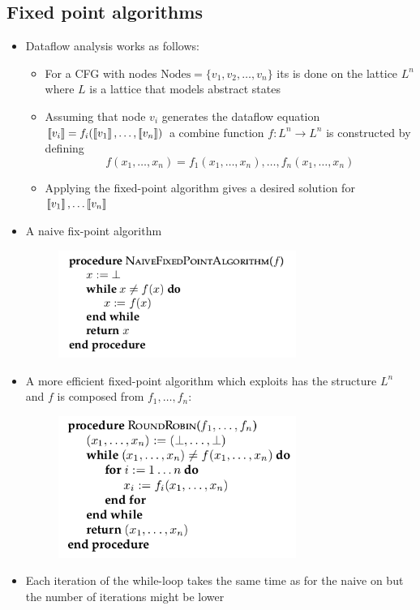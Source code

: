 \subsection{Fixed point algorithms}
\begin{itemize}
  \item Dataflow analysis works as follows:
  \begin{itemize}
  	\item For a CFG with nodes $\text{Nodes} = \{v_1, v_2, \dots, v_n\}$ its is done on the lattice $L^n$ where $L$ is a lattice that models abstract states
  	\item Assuming that node $v_i$ generates the dataflow equation $\left\llbracket v_i\right\rrbracket = f_i(\left\llbracket v_1\right\rrbracket, \dots, \left\llbracket v_n\right\rrbracket)$  a combine function $f:L^n \to L^n$ is constructed by defining 
    \[
      f(x_1, \dots, x_n) = f_1(x_1, \dots, x_n), \dots, f_n(x_1, \dots, x_n)
    \]
  	\item Applying the fixed-point algorithm gives a desired solution for $\left\llbracket v_1\right\rrbracket , \dots \left\llbracket v_n\right\rrbracket$
  \end{itemize}
  \item A naive fix-point algorithm
  \begin{figure}[H]
  	\centering
  	\includegraphics[width=220pt]{img/monotone/naive}
  \end{figure}
  \item A more efficient fixed-point algorithm which exploits has the structure $L^n$ and $f$ is composed from $f_1, \dots, f_n$:
  \begin{figure}[H]
  	\centering
  	\includegraphics[width=220pt]{img/monotone/round_robin}
  \end{figure}
  \item Each iteration of the while-loop takes the same time as for the naive on but the number of iterations might be lower

\end{itemize}
